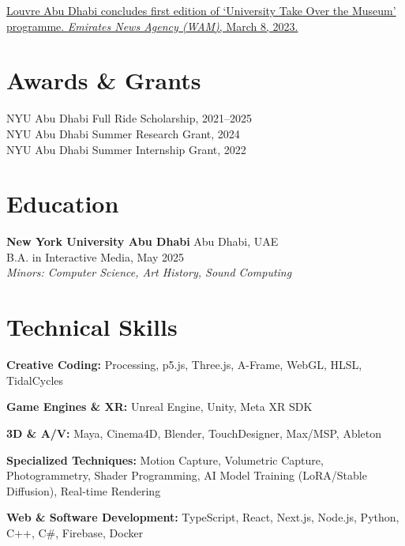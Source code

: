 \documentclass[11pt,a4paper]{article}
\begin{document}
\href{https://www.wam.ae/en/details/1395303137255}{Louvre Abu Dhabi concludes first edition of `University Take Over the Museum' programme. \textit{Emirates News Agency (WAM)}, March 8, 2023.}

\section*{Awards \& Grants}
NYU Abu Dhabi Full Ride Scholarship, 2021--2025 \\
NYU Abu Dhabi Summer Research Grant, 2024 \\
NYU Abu Dhabi Summer Internship Grant, 2022

\section*{Education}
\textbf{New York University Abu Dhabi} \hfill Abu Dhabi, UAE\\
B.A. in Interactive Media, May 2025\\
\textit{Minors: Computer Science, Art History, Sound Computing}

\section*{Technical Skills}

\textbf{Creative Coding:} Processing, p5.js, Three.js, A-Frame, WebGL, HLSL, TidalCycles

\textbf{Game Engines \& XR:} Unreal Engine, Unity, Meta XR SDK

\textbf{3D \& A/V:} Maya, Cinema4D, Blender, TouchDesigner, Max/MSP, Ableton

\textbf{Specialized Techniques:} Motion Capture, Volumetric Capture, Photogrammetry, Shader Programming, AI Model Training (LoRA/Stable Diffusion), Real-time Rendering

\textbf{Web \& Software Development:} TypeScript, React, Next.js, Node.js, Python, C++, C\#, Firebase, Docker
\end{document}
